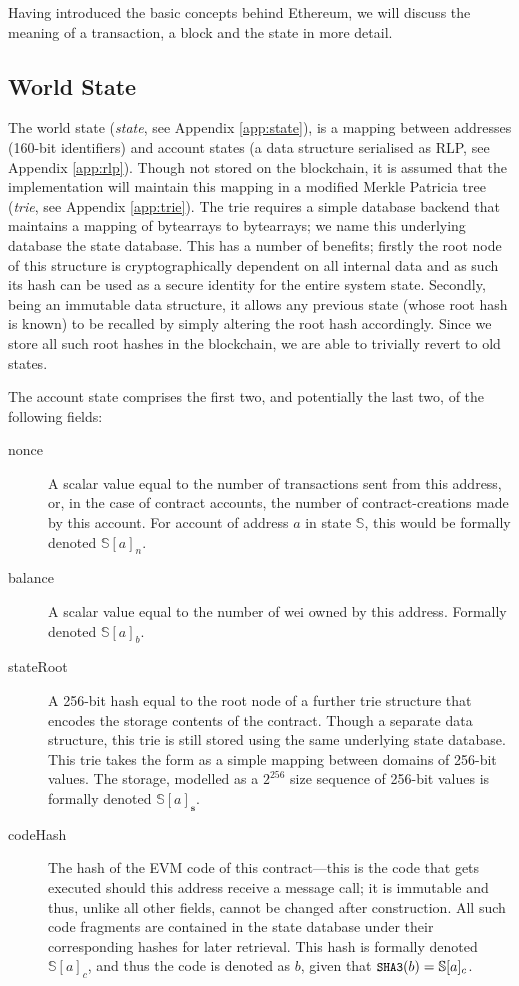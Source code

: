 \documentclass[9pt,oneside]{amsart}
\begin{document}
\begin{multicols}{2}
Having introduced the basic concepts behind Ethereum, we will discuss the meaning of a transaction, a block and the state in more detail.

\subsection{World State} \label{ch:state}

The world state (\textit{state}, see Appendix \ref{app:state}), is a mapping between addresses (160-bit identifiers) and account states (a data structure serialised as RLP, see Appendix \ref{app:rlp}). Though not stored on the blockchain, it is assumed that the implementation will maintain this mapping in a modified Merkle Patricia tree (\textit{trie}, see Appendix \ref{app:trie}). The trie requires a simple database backend that maintains a mapping of bytearrays to bytearrays; we name this underlying database the state database. This has a number of benefits; firstly the root node of this structure is cryptographically dependent on all internal data and as such its hash can be used as a secure identity for the entire system state. Secondly, being an immutable data structure, it allows any previous state (whose root hash is known) to be recalled by simply altering the root hash accordingly. Since we store all such root hashes in the blockchain, we are able to trivially revert to old states.

The account state comprises the first two, and potentially the last two, of the following fields:

\begin{description}
\item[nonce] A scalar value equal to the number of transactions sent from this address, or, in the case of contract accounts, the number of contract-creations made by this account. For account of address $a$ in state $\mathbb{S}$, this would be formally denoted $\mathbb{S}[a]_n$.
\item[balance] A scalar value equal to the number of wei owned by this address. Formally denoted $\mathbb{S}[a]_b$.
\item[stateRoot] A 256-bit hash equal to the root node of a further trie structure that encodes the storage contents of the contract. Though a separate data structure, this trie is still stored using the same underlying state database. This trie takes the form as a simple mapping between domains of 256-bit values. The storage, modelled as a $2^{256}$ size sequence of 256-bit values is formally denoted $\mathbb{S}[a]_\mathbf{s}$.
\item[codeHash] The hash of the EVM code of this contract---this is the code that gets executed should this address receive a message call; it is immutable and thus, unlike all other fields, cannot be changed after construction. All such code fragments are contained in the state database under their corresponding hashes for later retrieval. This hash is formally denoted $\mathbb{S}[a]_c$, and thus the code is denoted as $b$, given that $\texttt{\small SHA3}(b) = \mathbb{S}[a]_c$.
\end{description}


\end{multicols}
\end{document}

